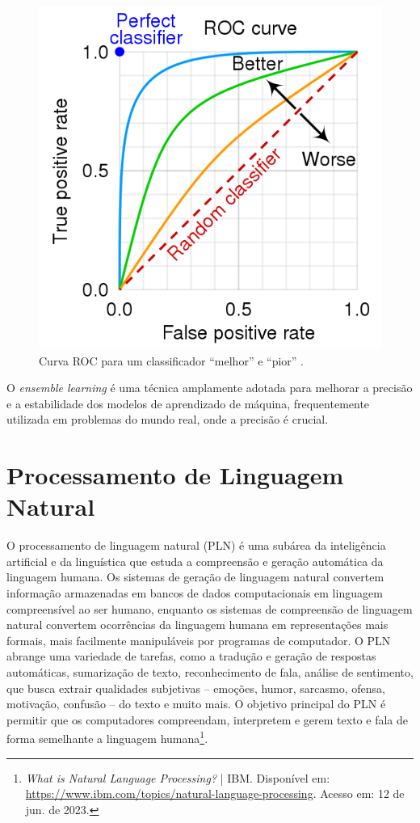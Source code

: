 \begin{figure}[!htbp]
	\centering
	\includegraphics[scale=0.36]{imagens/auroc.png}
    \caption {Curva ROC para um classificador ``melhor'' e ``pior'' \cite{RocCurveWiki}.}
\end{figure}


O \textit{ensemble learning} é uma técnica amplamente adotada para melhorar a precisão e a estabilidade dos modelos de aprendizado de máquina, frequentemente utilizada em problemas do mundo real, onde a precisão é crucial.

\section{Processamento de Linguagem Natural}

O processamento de linguagem natural (PLN) é uma subárea da inteligência artificial e da linguística que estuda a compreensão e geração automática da linguagem humana. Os sistemas de geração de linguagem natural convertem informação armazenadas em bancos de dados computacionais em linguagem compreensível ao ser humano, enquanto os sistemas de compreensão de linguagem natural convertem ocorrências da linguagem humana em representações mais formais, mais facilmente manipuláveis por programas de computador. O PLN abrange uma variedade de tarefas, como a tradução e geração de respostas automáticas, sumarização de texto, reconhecimento de fala, análise de sentimento, que busca extrair qualidades subjetivas – emoções, humor, sarcasmo, ofensa, motivação, confusão – do texto e muito mais. O objetivo principal do PLN é permitir que os computadores compreendam, interpretem e gerem texto e fala de forma semelhante a linguagem humana\footnote{\textit{What is Natural Language Processing?} | IBM. Disponível em: \url{https://www.ibm.com/topics/natural-language-processing}. Acesso em: 12 de jun. de 2023.}.


